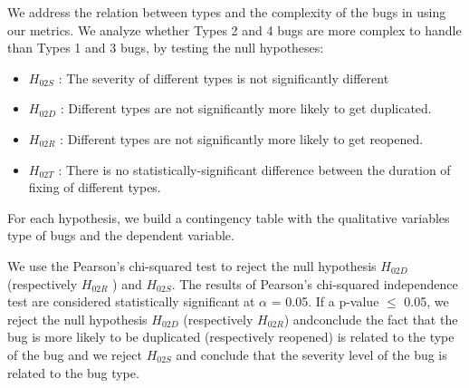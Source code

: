 We address the relation between types and the complexity of the bugs in using our metrics.
We analyze whether Types 2 and 4 bugs are more complex to handle than Types 1 and 3 bugs, by testing the null hypotheses:

\begin{itemize}
 \item  $H_{02S}$ : The severity of different types is not significantly different
 \item  $H_{02D}$ : Different types are not significantly more likely to get duplicated.
 \item  $H_{02R}$ : Different types are not significantly more likely to get reopened.
 \item $H_{02T}$ : There is no statistically-significant difference
between the duration of fixing of different types.
\end{itemize}

For each hypothesis, we build a contingency table with the qualitative variables type of bugs and the dependent variable.

We use the Pearson's chi-squared test to reject the null
hypothesis $H_{02D}$ (respectively $H_{02R}$ ) and $H_{02S}$. The results of Pearson's chi-squared independence test are considered
statistically significant at $\alpha$ = 0.05.
If a p-value $\le$ 0.05, we reject the null hypothesis $H_{02D}$ (respectively $H_{02R}$) andconclude the fact that the bug is more likely to be duplicated (respectively reopened) is related to the type of the bug and we reject $H_{02S}$ and conclude that the severity level of the bug is related to the bug type.
